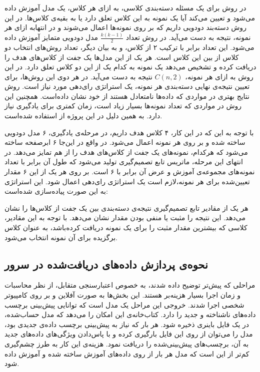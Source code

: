 در روش  برای یک مسئله دسته‌بندی  کلاسی،‌ به ازای هر کلاس، یک مدل  آموزش داده می‌شود و تعیین می‌کند آیا یک نمونه به این کلاس تعلق دارد یا به بقیه‌ی کلاس‌ها. در این روش  دسته‌بند دودویی داریم که بر روی نمونه‌ها اعمال می‌شوند و در انتهابه ازای هر نمونه،  نتیجه به دست می‌آید. 
در روش  تعداد $\frac{k(k-1)}{2}$ مدل  دودویی متمایز آموزش داده می‌شود. این تعداد برابر با ترکیب ۲ از  کلاس،‌ و به بیان دیگر، تعداد روش‌های انتخاب دو کلاس از بین این  کلاس است. هر یک از این مدل‌ها یک جفت از کلاس‌های هدف را دریافت کرده و تشخیص می‌دهد یک نمونه به کدام یک از این دو کلاس تعلق دارد. در این روش به ازای هر نمونه، $C(n, 2)$ نتیجه به دست می‌آید.
در هر دوی این روش‌ها، برای تعیین نتیجه‌ی نهایی دسته‌بندی هر نمونه، یک استراتژی رای‌دهی مورد نیاز است. روش  نتایج بهتری در مواردی که داده‌ها نامتعادل هستند از خود نشان داده‌است. همچنین این روش در مواردی که تعداد نمونه‌ها بسیار زیاد است،‌ زمان کمتری برای یادگیری نیاز دارد.\cite{Mondejar} به همین دلیل در این پروژه از  استفاده شده‌است.

با توجه به این که در این کار‌،‌ ۴ کلاس هدف داریم، در مرحله‌ی یادگیری‌، ۶ مدل دودویی ساخته شده و بر روی هر نمونه اعمال می‌شود. در واقع در این‌جا ۶ ابرصفحه ساخته می‌شود که هرکدام، نمونه‌های  یک جفت از کلاس‌های هدف را از هم تمایز می‌دهد. در انتهای این مرحله،‌ ماتریس تابع تصمیم‌گیری تولید می‌شود که طول آن برابر با تعداد نمونه‌های مجموعه‌ی آموزش و عرض آن برابر با ۶ است. بر روی هر یک از این ۶ مقدار تعیین‌شده برای هر نمونه،‌لازم است یک استراتژی رای‌دهی اعمال شود. این استراتژی به این صورت پیاده‌سازی شده‌است:

هر یک از مقادیر تابع تصمیم‌گیری نتیجه‌ی دسته‌بندی بین یک جفت از کلاس‌ها را نشان می‌دهد. این نتیجه را مثبت یا منفی بودن مقدار نشان می‌دهد. با توجه به این مقادیر، کلاسی که بیشترین مقدار مثبت را برای یک نمونه دریافت کرده‌باشد، به عنوان کلاس برگزیده برای آن نمونه انتخاب می‌شود. 

	\subsection{نحوه‌ی پردازش داده‌های دریافت‌شده در سرور}

مراحلی که پیش‌تر توضیح داده شدند، به خصوص اعتبارسنجی متقابل، از نظر محاسبات و زمان اجرا بسیار هزینه‌بر هستند. این بخش‌ها به صورت آفلاین و بر روی کامپیوتر شخصی اجرا شدند. خروجی این مراحل یک مدل  است که توانایی پیش‌بینی برچسب داده‌‌های ناشناخته و جدید را دارد. کتاب‌خانه‌ی  این امکان را می‌دهد که مدل  حساب‌شده، در یک فایل باینری ذخیره شود. هر بار که نیاز به پیش‌بینی برچسب داده‌ی جدیدی بود، مدل  را می‌توان از روی این فایل بارگیری کرده و با پاس‌دادن ویژگی‌های داده‌های جدید به آن، برچسب‌های پیش‌بینی‌شده را دریافت نمود. هزینه‌ی این کار به طرز چشم‌گیری کم‌تر از این است که مدل هر بار از روی داده‌های آموزش ساخته‌ شده و آموزش داده شود.


